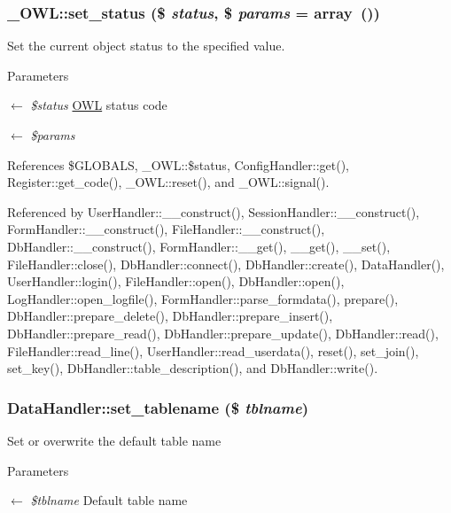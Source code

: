 \subsubsection[{set\_\-status}]{\setlength{\rightskip}{0pt plus 5cm}\_\-OWL::set\_\-status (\$ {\em status}, \/  \$ {\em params} = {\ttfamily array~()})}\label{class__OWL_aea912d0ede9b3c2a69b79072d94d4787}
Set the current object status to the specified value.


\begin{DoxyParams}{Parameters}
\item[\mbox{$\leftarrow$} {\em \$status}]\hyperlink{classOWL}{OWL} status code \item[\mbox{$\leftarrow$} {\em \$params}]\end{DoxyParams}


References \$GLOBALS, \_\-OWL::\$status, ConfigHandler::get(), Register::get\_\-code(), \_\-OWL::reset(), and \_\-OWL::signal().



Referenced by UserHandler::\_\-\_\-construct(), SessionHandler::\_\-\_\-construct(), FormHandler::\_\-\_\-construct(), FileHandler::\_\-\_\-construct(), DbHandler::\_\-\_\-construct(), FormHandler::\_\-\_\-get(), \_\-\_\-get(), \_\-\_\-set(), FileHandler::close(), DbHandler::connect(), DbHandler::create(), DataHandler(), UserHandler::login(), FileHandler::open(), DbHandler::open(), LogHandler::open\_\-logfile(), FormHandler::parse\_\-formdata(), prepare(), DbHandler::prepare\_\-delete(), DbHandler::prepare\_\-insert(), DbHandler::prepare\_\-read(), DbHandler::prepare\_\-update(), DbHandler::read(), FileHandler::read\_\-line(), UserHandler::read\_\-userdata(), reset(), set\_\-join(), set\_\-key(), DbHandler::table\_\-description(), and DbHandler::write().

\subsubsection[{set\_\-tablename}]{\setlength{\rightskip}{0pt plus 5cm}DataHandler::set\_\-tablename (\$ {\em tblname})}\label{classDataHandler_abcb68472abd7da8ee6296421f0a7f2e9}
Set or overwrite the default table name


\begin{DoxyParams}{Parameters}
\item[\mbox{$\leftarrow$} {\em \$tblname}]Default table name \end{DoxyParams}


